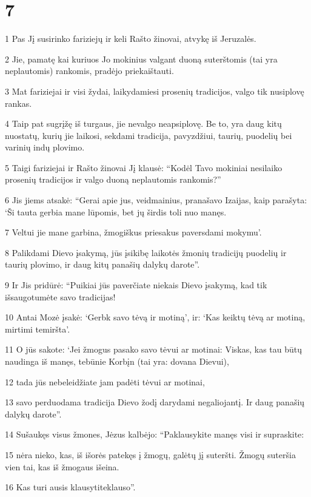 \chapter{7}


\par 1 Pas Jį susirinko fariziejų ir keli Rašto žinovai, atvykę iš Jeruzalės. 
\par 2 Jie, pamatę kai kuriuos Jo mokinius valgant duoną suterštomis (tai yra neplautomis) rankomis, pradėjo priekaištauti. 
\par 3 Mat fariziejai ir visi žydai, laikydamiesi prosenių tradicijos, valgo tik nusiplovę rankas. 
\par 4 Taip pat sugrįžę iš turgaus, jie nevalgo neapsiplovę. Be to, yra daug kitų nuostatų, kurių jie laikosi, sekdami tradicija, pavyzdžiui, taurių, puodelių bei varinių indų plovimo. 
\par 5 Taigi fariziejai ir Rašto žinovai Jį klausė: “Kodėl Tavo mokiniai nesilaiko prosenių tradicijos ir valgo duoną neplautomis rankomis?” 
\par 6 Jis jiems atsakė: “Gerai apie jus, veidmainius, pranašavo Izaijas, kaip parašyta: ‘Ši tauta gerbia mane lūpomis, bet jų širdis toli nuo manęs. 
\par 7 Veltui jie mane garbina, žmogiškus priesakus paversdami mokymu’. 
\par 8 Palikdami Dievo įsakymą, jūs įsikibę laikotės žmonių tradicijų­ puodelių ir taurių plovimo, ir daug kitų panašių dalykų darote”. 
\par 9 Ir Jis pridūrė: “Puikiai jūs paverčiate niekais Dievo įsakymą, kad tik išsaugotumėte savo tradicijas! 
\par 10 Antai Mozė įsakė: ‘Gerbk savo tėvą ir motiną’, ir: ‘Kas keiktų tėvą ar motiną, mirtimi temiršta’. 
\par 11 O jūs sakote: ‘Jei žmogus pasako savo tėvui ar motinai: Viskas, kas tau būtų naudinga iš manęs, tebūnie Korbįn (tai yra: dovana Dievui),­ 
\par 12 tada jūs nebeleidžiate jam padėti tėvui ar motinai, 
\par 13 savo perduodama tradicija Dievo žodį darydami negaliojantį. Ir daug panašių dalykų darote”. 
\par 14 Sušaukęs visus žmones, Jėzus kalbėjo: “Paklausykite manęs visi ir supraskite: 
\par 15 nėra nieko, kas, iš išorės patekęs į žmogų, galėtų jį suteršti. Žmogų suteršia vien tai, kas iš žmogaus išeina. 
\par 16 Kas turi ausis klausyti­teklauso”. 
